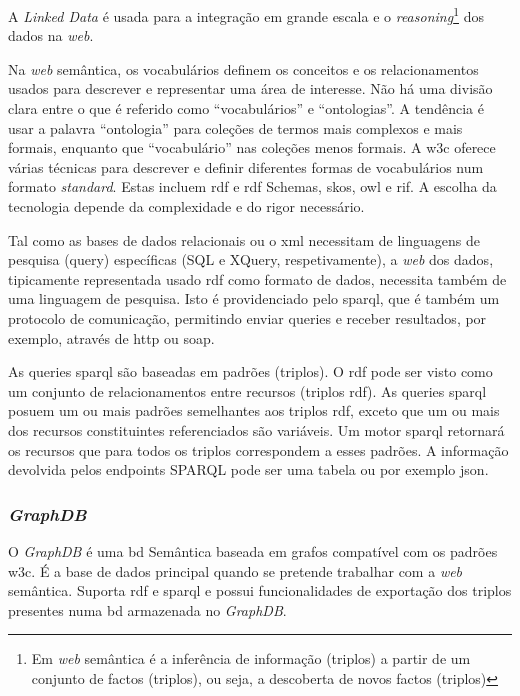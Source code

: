 A \textit{Linked Data} é usada para a integração em grande escala e o \textit{reasoning}\footnote{Em \textit{web} semântica é a inferência de informação (triplos) a partir de um conjunto de factos (triplos), ou seja, a descoberta de novos factos (triplos)} dos dados na \textit{web}.

Na \textit{web} semântica, os vocabulários definem os conceitos e os relacionamentos usados para descrever e representar uma área de interesse. Não há uma divisão clara entre o que é referido como ``vocabulários'' e ``ontologias''. A tendência é usar a palavra ``ontologia'' para coleções de termos mais complexos e mais formais, enquanto que ``vocabulário'' nas coleções menos formais. A \acrshort{w3c} oferece várias técnicas para descrever e definir diferentes formas de vocabulários num formato \textit{standard}. Estas incluem \acrshort{rdf} e \acrshort{rdf} Schemas, \acrshort{skos}, \acrshort{owl} e \acrshort{rif}. A escolha da tecnologia depende da complexidade e do rigor necessário.

Tal como as bases de dados relacionais ou o \acrshort{xml} necessitam de linguagens de pesquisa (query) específicas (SQL e XQuery, respetivamente), a \textit{web} dos dados, tipicamente representada usado \acrshort{rdf} como formato de dados, necessita também de uma linguagem de pesquisa. Isto é providenciado pelo \acrshort{sparql}, que é também um protocolo de comunicação, permitindo enviar queries e receber resultados, por exemplo, através de \acrshort{http} ou \acrshort{soap}.

As queries \acrshort{sparql} são baseadas em padrões (triplos). O \acrshort{rdf} pode ser visto como um conjunto de relacionamentos entre recursos (triplos \acrshort{rdf}). As queries \acrshort{sparql} posuem um ou mais padrões semelhantes aos triplos \acrshort{rdf}, exceto que um ou mais dos recursos constituintes referenciados são variáveis. Um motor \acrshort{sparql} retornará os recursos que para todos os triplos correspondem a esses padrões. A informação devolvida pelos endpoints SPARQL pode ser uma tabela ou por exemplo \acrshort{json}.

\subsubsection{\textit{GraphDB}}

O \textit{GraphDB} é uma \acrfull{bd} Semântica baseada em grafos compatível com os padrões \acrshort{w3c}. É a base de dados principal quando se pretende trabalhar com a \textit{web} semântica. Suporta \acrshort{rdf} e \acrshort{sparql} e possui funcionalidades de exportação dos triplos presentes numa \acrshort{bd} armazenada no \textit{GraphDB}.

